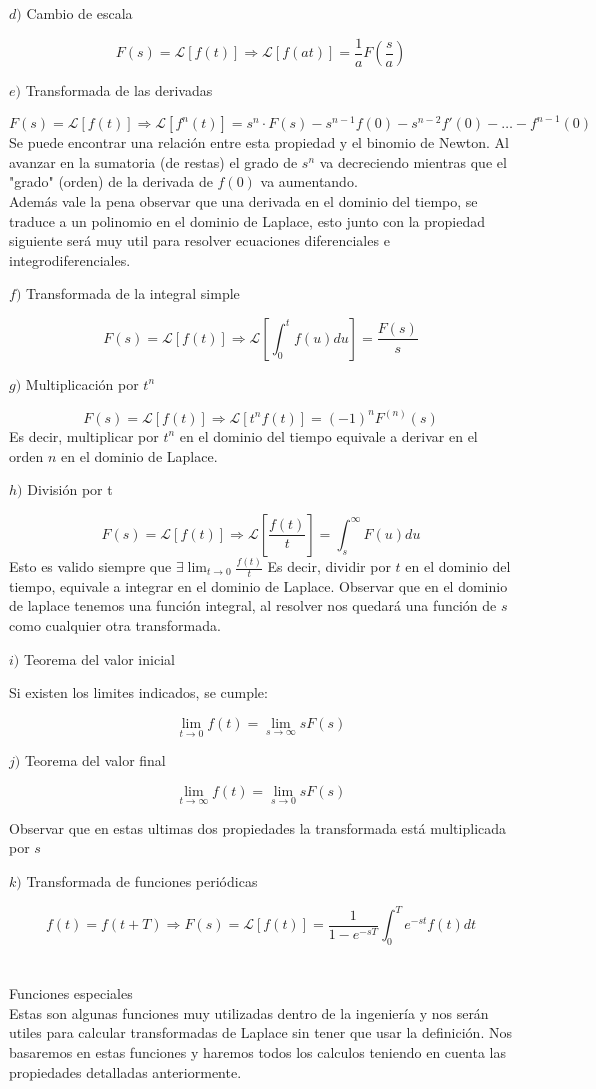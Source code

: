 \documentclass[]{article}
\begin{document}
$d)$ Cambio de escala


$$
F(s) = \mathscr{L}[f(t)] \Rightarrow \mathscr{L}[f(at)] = \frac{1}{a}F(\frac{s}{a})	
$$

$e)$ Transformada de las derivadas

$$
F(s) = \mathscr{L}[f(t)] \Rightarrow \mathscr{L}[f^{n}(t)] = s^{n}\cdot F(s) -s^{n-1}f(0) - s^{n-2} f'(0) - \dots - f^{n-1}(0)
$$
Se puede encontrar una relación entre esta propiedad y el binomio de Newton. Al avanzar en la sumatoria (de restas) el grado de $s^{n}$ va decreciendo mientras que el "grado" (orden) de la derivada de $f(0)$ va aumentando.\\
Además vale la pena observar que una derivada en el dominio del tiempo, se traduce a un polinomio en el dominio de Laplace, esto junto con la propiedad siguiente será muy util para resolver ecuaciones diferenciales e integrodiferenciales.

$f)$ Transformada de la integral simple

$$
F(s) = \mathscr{L}[f(t)] \Rightarrow \mathscr{L}[\int_{0}^{t}f(u)du] = \frac{F(s)}{s}
$$

$g)$ Multiplicación por $t^{n}$

$$
F(s) = \mathscr{L}[f(t)] \Rightarrow \mathscr{L}[t^{n}f(t)] = (-1)^{n}F^{(n)}(s)
$$
Es decir, multiplicar por $t^{n}$	en el dominio del tiempo equivale a derivar en el orden $n$ en el dominio de Laplace.

$h)$ División por t

$$
F(s) = \mathscr{L}[f(t)] \Rightarrow \mathscr{L}[\frac{f(t)}{t}] = \int_{s}^{\infty}F(u)du
$$
Esto es valido siempre que $\exists \lim_{t\rightarrow 0} \frac{f(t)}{t}$
Es decir, dividir por $t$ en el dominio del tiempo, equivale a integrar en el dominio de Laplace. Observar que en el dominio de laplace tenemos una función integral, al resolver nos quedará una función de $s$ como cualquier otra transformada.

$i)$ Teorema del valor inicial

Si existen los limites indicados, se cumple:

$$
\lim_{t\rightarrow 0} f(t) = \lim_{s\rightarrow \infty} sF(s)
$$

$j)$ Teorema del valor final

$$
\lim_{t\rightarrow \infty} f(t) = \lim_{s\rightarrow 0} sF(s)
$$

Observar que en estas ultimas dos propiedades la transformada está multiplicada por $s$

$k)$ Transformada de funciones periódicas

$$
f(t) = f(t+T) \Rightarrow F(s) = \mathscr{L}[f(t)] = \frac{1}{1-e^{-sT}}\int_{0}^{T}e^{-st}f(t)dt
$$
\\
\\

\large Funciones especiales
\normalsize
\\

Estas son algunas funciones muy utilizadas dentro de la ingeniería y nos serán utiles para calcular transformadas de Laplace sin tener que usar la definición. Nos basaremos en estas funciones y haremos todos los calculos teniendo en cuenta las propiedades detalladas anteriormente.
\end{document}
